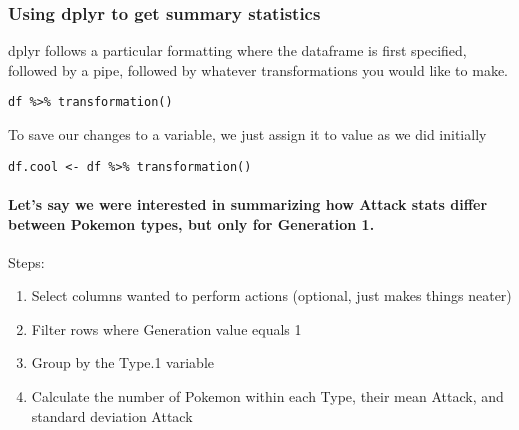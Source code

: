 \documentclass[
]{article}
\providecommand{\tightlist}{%
  \setlength{\itemsep}{0pt}\setlength{\parskip}{0pt}}
\begin{document}
\hypertarget{using-dplyr-to-get-summary-statistics}{%
\subsubsection{Using dplyr to get summary
statistics}\label{using-dplyr-to-get-summary-statistics}}

dplyr follows a particular formatting where the dataframe is first
specified, followed by a pipe, followed by whatever transformations you
would like to make.

\texttt{df\ \%\textgreater{}\%\ transformation()}

To save our changes to a variable, we just assign it to value as we did
initially

\texttt{df.cool\ \textless{}-\ df\ \%\textgreater{}\%\ transformation()}

\hypertarget{lets-say-we-were-interested-in-summarizing-how-attack-stats-differ-between-pokemon-types-but-only-for-generation-1.}{%
\paragraph{Let's say we were interested in summarizing how Attack stats
differ between Pokemon types, but only for Generation
1.}\label{lets-say-we-were-interested-in-summarizing-how-attack-stats-differ-between-pokemon-types-but-only-for-generation-1.}}

Steps:

\begin{enumerate}
\def\labelenumi{\arabic{enumi}.}
\tightlist
\item
  Select columns wanted to perform actions (optional, just makes things
  neater)
\item
  Filter rows where Generation value equals 1
\item
  Group by the Type.1 variable
\item
  Calculate the number of Pokemon within each Type, their mean Attack,
  and standard deviation Attack
\end{enumerate}
\end{document}
